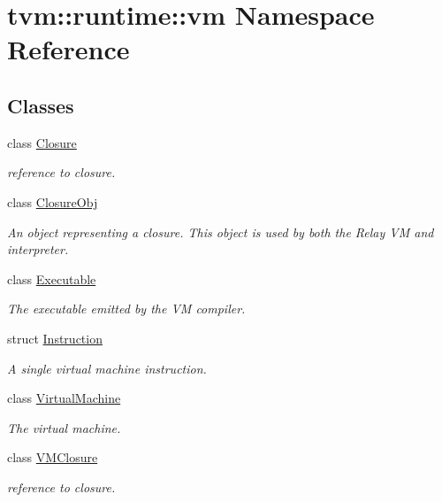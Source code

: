 \hypertarget{namespacetvm_1_1runtime_1_1vm}{}\section{tvm\+:\+:runtime\+:\+:vm Namespace Reference}
\label{namespacetvm_1_1runtime_1_1vm}
\subsection*{Classes}
\begin{DoxyCompactItemize}
\item 
class \hyperlink{classtvm_1_1runtime_1_1vm_1_1Closure}{Closure}
\begin{DoxyCompactList}\small\item\em reference to closure. \end{DoxyCompactList}\item 
class \hyperlink{classtvm_1_1runtime_1_1vm_1_1ClosureObj}{Closure\+Obj}
\begin{DoxyCompactList}\small\item\em An object representing a closure. This object is used by both the Relay VM and interpreter. \end{DoxyCompactList}\item 
class \hyperlink{classtvm_1_1runtime_1_1vm_1_1Executable}{Executable}
\begin{DoxyCompactList}\small\item\em The executable emitted by the VM compiler. \end{DoxyCompactList}\item 
struct \hyperlink{structtvm_1_1runtime_1_1vm_1_1Instruction}{Instruction}
\begin{DoxyCompactList}\small\item\em A single virtual machine instruction. \end{DoxyCompactList}\item 
class \hyperlink{classtvm_1_1runtime_1_1vm_1_1VirtualMachine}{Virtual\+Machine}
\begin{DoxyCompactList}\small\item\em The virtual machine. \end{DoxyCompactList}\item 
class \hyperlink{classtvm_1_1runtime_1_1vm_1_1VMClosure}{V\+M\+Closure}
\begin{DoxyCompactList}\small\item\em reference to closure. \end{DoxyCompactList}\item 

\end{DoxyCompactItemize}
